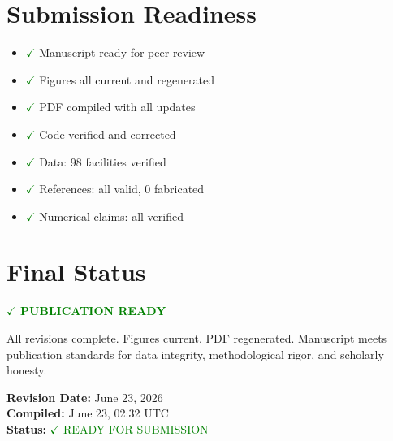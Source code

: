 \documentclass[11pt,a4paper]{article}
\begin{document}
\section{Submission Readiness}

\begin{itemize}
\item \textcolor{green}{$\checkmark$} Manuscript ready for peer review
\item \textcolor{green}{$\checkmark$} Figures all current and regenerated
\item \textcolor{green}{$\checkmark$} PDF compiled with all updates
\item \textcolor{green}{$\checkmark$} Code verified and corrected
\item \textcolor{green}{$\checkmark$} Data: 98 facilities verified
\item \textcolor{green}{$\checkmark$} References: all valid, 0 fabricated
\item \textcolor{green}{$\checkmark$} Numerical claims: all verified
\end{itemize}

\section{Final Status}

\textbf{\textcolor{green}{$\checkmark$ PUBLICATION READY}}

All revisions complete. Figures current. PDF regenerated. Manuscript meets publication standards for data integrity, methodological rigor, and scholarly honesty.

\vspace{2cm}

\noindent
\textbf{Revision Date:} June 23, 2026\\
\textbf{Compiled:} June 23, 02:32 UTC\\
\textbf{Status:} \textcolor{green}{$\checkmark$ READY FOR SUBMISSION}
\end{document}
